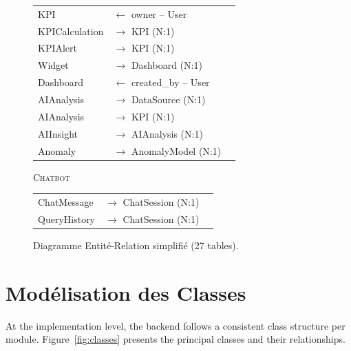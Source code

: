 \begin{figure}[h!]
{{\begin{tabular}{|l|l|l|}
\hline
KPI & $\leftarrow$ owner -- User & \\
KPICalculation & $\rightarrow$ KPI (N:1) & \\
KPIAlert & $\rightarrow$ KPI (N:1) & \\
Widget & $\rightarrow$ Dashboard (N:1) & \\
Dashboard & $\leftarrow$ created\_by -- User & \\
AIAnalysis & $\rightarrow$ DataSource (N:1) & \\
AIAnalysis & $\rightarrow$ KPI (N:1) & \\
AIInsight & $\rightarrow$ AIAnalysis (N:1) & \\
Anomaly & $\rightarrow$ AnomalyModel (N:1) & \\
\hline
\end{tabular}

\vspace{0.3cm}
\textsc{Chatbot}

\begin{tabular}{|l|l|l|}
\hline
ChatMessage & $\rightarrow$ ChatSession (N:1) & \\
QueryHistory & $\rightarrow$ ChatSession (N:1) & \\
\hline
\end{tabular}

\vspace{0.5cm}
}}
\caption{Diagramme Entité-Relation simplifié (27 tables).}
\label{fig:erd}
\end{figure}


\section{Modélisation des Classes}

\noindent
At the implementation level, the backend follows
a consistent class structure per module.
Figure~\ref{fig:classes} presents the principal classes
and their relationships.

